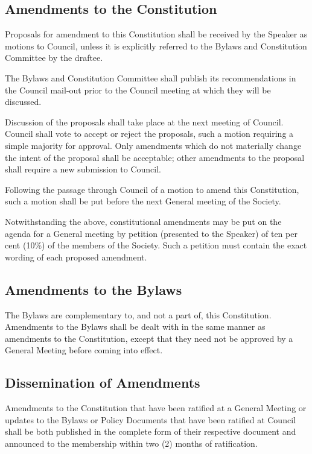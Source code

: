 \subsection {Amendments to the Constitution}
	\begin{longenum}[label*=\thesubsection.\arabic*., align=left]
	\item Proposals for amendment to this Constitution shall be received by the Speaker as motions to Council, unless it is explicitly referred to the Bylaws and Constitution Committee by the draftee.
    \item The Bylaws and Constitution Committee shall publish its recommendations in the Council mail-out prior to the Council meeting at which they will be discussed.
    \item Discussion of the proposals shall take place at the next meeting of Council. Council shall vote to accept or reject the proposals, such a motion requiring a simple majority for approval. Only amendments which do not materially change the intent of the proposal shall be acceptable; other amendments to the proposal shall require a new submission to Council.
    \item Following the passage through Council of a motion to amend this Constitution, such a motion shall be put before the next General meeting of the Society. 
    \item Notwithstanding the above, constitutional amendments may be put on the agenda for a General meeting by petition (presented to the Speaker) of ten per cent (10\%) of the members of the Society. Such a petition must contain the exact wording of each proposed amendment.
\end{longenum}
\subsection {Amendments to the Bylaws}
	\begin{longenum}[label*=\thesubsection.\arabic*., align=left]
	\item The Bylaws are complementary to, and not a part of, this Constitution. Amendments to the Bylaws shall be dealt with in the same manner as amendments to the Constitution, except that they need not be approved by a General Meeting before coming into effect.
\end{longenum}
\subsection{Dissemination of Amendments}
	\begin{longenum}[label*=\thesubsection.\arabic*., align=left]
	\item Amendments to the Constitution that have been ratified at a General Meeting or updates to the Bylaws or Policy Documents that have been ratified at Council shall be both published in the complete form of their respective document and announced to the membership within two (2) months of ratification.
\end{longenum}
\newpage

